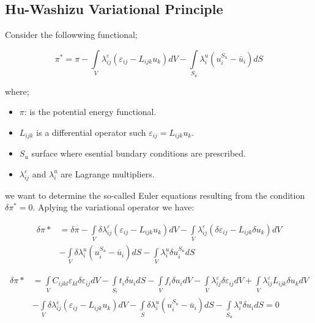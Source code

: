 \subsection{Hu-Washizu Variational Principle}
Consider the followwing functional;

\begin{equation}
{\pi ^*} = \pi  - \int\limits_V {\lambda _{ij}^\varepsilon ({\varepsilon _{ij}} - {L_{ijk}}{u_k})dV}  - \int\limits_{{S_u}} {\lambda _i^u(u_i^{{S_u}} - {{\bar u}_i})dS}
\label{Hu}
\end{equation}

where;

\begin{itemize}
\item $\pi$: is the potential energy functional.
\item $L_{ijk}$ is a differential operator such ${\varepsilon _{ij}} = {L_{ijk}}{u_k}$.
\item $S_u$ surface where esential bundary conditions are prescribed.
\item $\lambda _{ij}^\varepsilon $ and ${\lambda _i^u}$ are Lagrange multipliers.
\end{itemize}

we want to determine the so-called Euler equations resulting from the condition $\delta \pi^* = 0$. Aplying the variational operator we have:

\begin{equation}
\begin{aligned}
\delta \pi *& = \delta \pi  - \int\limits_V {\delta \lambda _{ij}^\varepsilon } ({\varepsilon _{ij}} - {L_{ijk}}{u_k})dV- \int\limits_V {\lambda _{ij}^\varepsilon } (\delta {\varepsilon _{ij}} - {L_{ijk}}\delta {u_k})dV \\
&-\int\limits_V {\delta \lambda _i^u} (u_i^{{S_u}} - {\bar u_i})dS - \int\limits_V {\lambda _i^u} \delta u_i^{{S_u}}dS
\end{aligned}
\end{equation}

\begin{equation}
\begin{aligned}
\delta \pi * &= \int\limits_V {{C_{ijkl}}{\varepsilon _{kl}}\delta {\varepsilon _{ij}}dV - \int\limits_{{S_t}} {{t_i}\delta {u_i}dS}  - \int\limits_V {{f_i}\delta {u_i}dV - } }\int\limits_V {\lambda _{ij}^\varepsilon \delta {\varepsilon _{ij}}dV}  + \int\limits_V {\lambda _{ij}^\varepsilon {L_{ijk}}\delta {u_k}dV}\\
&- \int\limits_V {\delta \lambda _{ij}^\varepsilon ({\varepsilon _{ij}} - {L_{ijk}}{u_k})dV - \int\limits_S {\delta \lambda _i^u(u_i^{{S_u}} - {{\bar u}_i})dS - \int\limits_{{S_u}} {\lambda _i^u\delta {u_i}dS = 0} } }
\end{aligned}
\end{equation}

